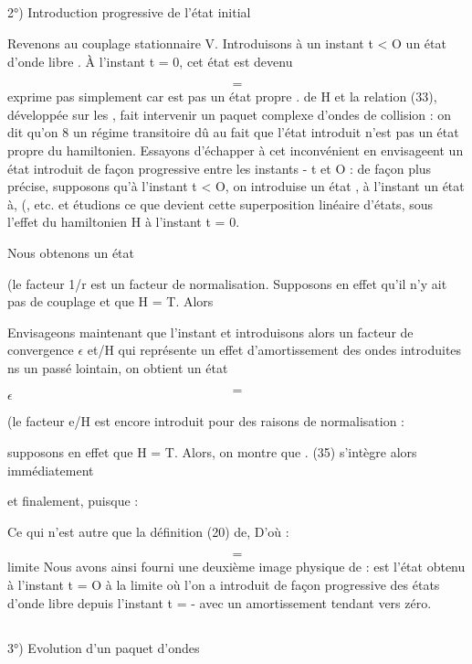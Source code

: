 
\subsection{}%
2°) Introduction progressive de l'état initial

Revenons au couplage stationnaire V.
Introduisons à un instant t < O un état d'onde libre 
. À l'instant t = 0, cet état est devenu

\[
\tag{33}=
\]
 exprime pas simplement car  est pas un état propre
. de H et la relation (33), développée sur les  , fait intervenir un
paquet complexe d'ondes de collision : on dit qu'on 8 un régime transitoire
dû au fait que l'état introduit n'est pas un état propre du hamiltonien.
Essayons d'échapper à cet inconvénient en envisageent un état introduit
de façon progressive entre les instants - t et O : de façon plus précise,
supposons qu'à l'instant t < O, on introduise un état  , à l'instant
 un état à, (, etc. et étudions ce que devient cette superposition linéaire d'états,
 sous l'effet du hamiltonien H à l'instant t = 0.

Nous obtenons un état

(le facteur 1/r est un facteur de normalisation. Supposons en effet qu'il
n'y ait pas de couplage et que H = T. Alors

Envisageons maintenant que l'instant  et introduisons alors un facteur de convergence
$\epsilon$ et/H qui représente un effet d'amortissement des ondes
introduites ns un passé lointain, on obtient un état

%
\[
\tag{35}=
\]
$\epsilon$ 

(le facteur e/H est encore introduit pour des raisons de normalisation :

supposons en effet que H = T. Alors, on montre que .
(35) s'intègre alors immédiatement

et finalement, puisque :

Ce qui n'est autre que la définition (20) de, D'où :

\[
\tag{36}=
\]
limite
Nous avons ainsi fourni une deuxième image physique de  :
 est l'état obtenu à l'instant t = O à la limite où l'on a introduit
de façon progressive des états d'onde libre  depuis l'instant t = - 
avec un amortissement tendant vers zéro.


\subsection{}%
3°) Evolution d'un paquet d'ondes

